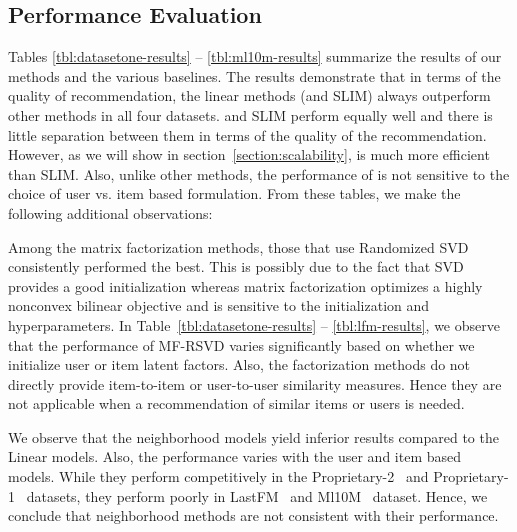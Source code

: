 \documentclass{article}
\newcommand{\citep}{\cite}
\newcommand{\MLens}{{\sc Ml10M }}
\newcommand{\LastFM}{{\sc LastFM }}
\newcommand{\datasetone}{{\sc Proprietary-1 }}
\newcommand{\datasettwo}{{\sc Proprietary-2 }}
\begin{document}
\hspace{-5em}
\subsection{Performance Evaluation}

Tables \ref{tbl:datasetone-results} -- \ref{tbl:ml10m-results} summarize the results of our methods and the various baselines.
The results demonstrate that in terms of the quality of recommendation, the linear methods (\LinearLow and SLIM) always outperform other methods
in all four datasets. \LinearLow and SLIM perform equally well and there is little separation between them in terms of the quality of
the recommendation. However, as we will show in section~\ref{section:scalability}, \LinearLow is much more efficient than SLIM.
Also, unlike other methods, the performance of \LinearLow is not sensitive to the choice of user vs. item based formulation.
From these tables, we make the following additional observations:
\begin{compactitem}

\item Among the matrix factorization methods, those that use Randomized SVD~\citep{Tang:2013} consistently performed the best. This is possibly due to the fact that SVD provides a good initialization
whereas matrix factorization optimizes a highly nonconvex bilinear objective and is sensitive to the initialization and hyperparameters. In Table~\ref{tbl:datasetone-results} -- \ref{tbl:lfm-results}, we observe that the performance of MF-RSVD varies significantly based on whether we initialize user or item latent factors. Also, the factorization methods do not directly provide item-to-item or user-to-user similarity measures. Hence they are not applicable
when a recommendation of similar items or users is needed.
\item We observe that the neighborhood models yield inferior results compared to the Linear models. Also, the performance varies with the user and item based models. While they perform competitively in the \datasettwo\ and \datasetone\ datasets, they perform poorly in \LastFM\ and \MLens\ dataset. Hence, we conclude that neighborhood methods are not consistent with their performance.
\end{compactitem}
\end{document}
